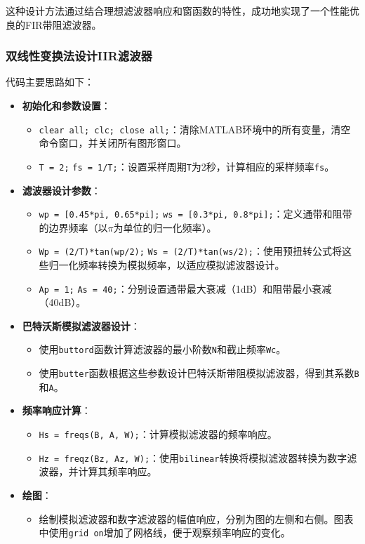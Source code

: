 \documentclass[a4paper,12pt]{article}
\begin{document}
这种设计方法通过结合理想滤波器响应和窗函数的特性，成功地实现了一个性能优良的FIR带阻滤波器。

\subsubsection{双线性变换法设计IIR滤波器}
代码主要思路如下：

\begin{itemize}
  \item \textbf{初始化和参数设置}：
  \begin{itemize}
    \item \texttt{clear all; clc; close all;}：清除MATLAB环境中的所有变量，清空命令窗口，并关闭所有图形窗口。
    \item \texttt{T = 2;} \texttt{fs = 1/T;}：设置采样周期\texttt{T}为2秒，计算相应的采样频率\texttt{fs}。
  \end{itemize}

  \item \textbf{滤波器设计参数}：
  \begin{itemize}
    \item \texttt{wp = [0.45*pi, 0.65*pi];} \texttt{ws = [0.3*pi, 0.8*pi];}：定义通带和阻带的边界频率（以$\pi$为单位的归一化频率）。
    \item \texttt{Wp = (2/T)*tan(wp/2);} \texttt{Ws = (2/T)*tan(ws/2);}：使用预扭转公式将这些归一化频率转换为模拟频率，以适应模拟滤波器设计。
    \item \texttt{Ap = 1;} \texttt{As = 40;}：分别设置通带最大衰减（1dB）和阻带最小衰减（40dB）。
  \end{itemize}

  \item \textbf{巴特沃斯模拟滤波器设计}：
  \begin{itemize}
    \item 使用\texttt{buttord}函数计算滤波器的最小阶数\texttt{N}和截止频率\texttt{Wc}。
    \item 使用\texttt{butter}函数根据这些参数设计巴特沃斯带阻模拟滤波器，得到其系数\texttt{B}和\texttt{A}。
  \end{itemize}

  \item \textbf{频率响应计算}：
  \begin{itemize}
    \item \texttt{Hs = freqs(B, A, W);}：计算模拟滤波器的频率响应。
    \item \texttt{Hz = freqz(Bz, Az, W);}：使用\texttt{bilinear}转换将模拟滤波器转换为数字滤波器，并计算其频率响应。
  \end{itemize}

  \item \textbf{绘图}：
  \begin{itemize}
    \item 绘制模拟滤波器和数字滤波器的幅值响应，分别为图的左侧和右侧。图表中使用\texttt{grid on}增加了网格线，便于观察频率响应的变化。
  \end{itemize}
\end{itemize}
\end{document}
